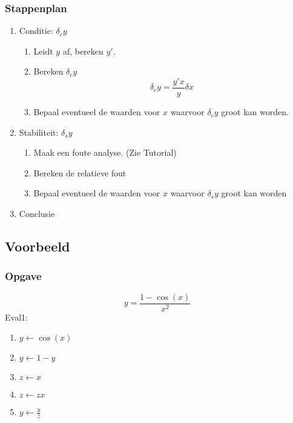 \documentclass[10pt,a4paper]{article}
\begin{document}
\subsubsection{Stappenplan}
\begin{enumerate}
\item Conditie: $\delta_c y$
\begin{enumerate}
\item Leidt $y$ af, bereken $y'$.
\item Bereken $\delta_c y$
\[
\delta_c y = \frac{y'x}{y}\delta x
\]
\item Bepaal eventueel de waarden voor $x$ waarvoor $\delta_c y$ groot kan worden.
\end{enumerate}

\item Stabiliteit: $\delta_s y$
\begin{enumerate}
\item Maak een foute analyse. (Zie Tutorial)
\item Bereken de relatieve fout
\item Bepaal eventueel de waarden voor $x$ waarvoor $\delta_s y$ groot kan worden
\end{enumerate}

\item Conclusie
\end{enumerate}

\subsection{Voorbeeld}
\subsubsection{Opgave}
\[
y = \frac{1-\cos(x)}{x^2}
\]
Eval1:
\begin{enumerate}
\item $y \leftarrow \cos(x)$
\item $y \leftarrow 1-y$
\item $z \leftarrow x$
\item $z \leftarrow zx$
\item $y \leftarrow \frac{y}{z}$
\end{enumerate}
\end{document}
